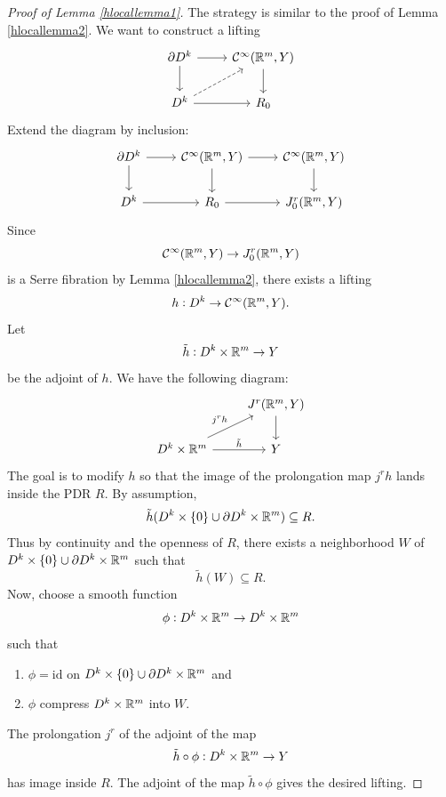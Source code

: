 \documentclass{article}
\newtheorem{proposed work}[theorem]{Proposed Work}
\theoremstyle{definition}
\begin{document}
\begin{proof}[Proof of Lemma \ref{hlocallemma1}]
The strategy is similar to the proof of Lemma \ref{hlocallemma2}. We
want to construct a lifting
\begin{equation*}
\begin{tikzcd}
\partial D^k \ar[d] \ar[r] &\cC^\infty(\R^m,Y) \ar[d] \\
D^k \ar[r] \ar[ur, dashed] & R_0
\end{tikzcd}
\end{equation*}
Extend the diagram by inclusion:
\begin{equation*}
\begin{tikzcd}
\partial D^k \ar[d] \ar[r] & \cC^\infty(\R^m,Y) \ar[d] \ar[r] & \cC^\infty(\R^m,Y) \ar[d] \\
D^k \ar[r] & R_0 \ar[r] & J^r_0(\R^m, Y)
\end{tikzcd}
\end{equation*}
Since
\begin{equation*}
\mathcal C^\infty(\mathbb R^m,Y) \to J^r_0(\mathbb R^m,Y)
\end{equation*}
is a Serre fibration by Lemma \ref{hlocallemma2}, there exists a lifting
\begin{equation*}
h: D^k \to \mathcal C^\infty(\mathbb R^m,Y).
\end{equation*}
Let
\begin{equation*}
\tilde{h}: D^k \times \mathbb R^m \to Y
\end{equation*}
be the adjoint of $h$. We have the following diagram:
\begin{equation*}
\begin{tikzcd}
{} & J^r(\R^m,Y) \ar[d] \\
D^k\times \R^m \ar[ur, "j^rh"] \ar[r, "\tilde{h}"] & Y
\end{tikzcd}
\end{equation*}
The goal is to modify $h$ so that the image of the prolongation map
$j^rh$ lands inside the PDR $R$. By assumption,
\begin{equation*}
\tilde{h}(D^k\times\{0\} \cup \partial D^k \times \mathbb R^m) \subseteq R.
\end{equation*}
Thus by continuity and the openness of $R$, there exists a
neighborhood $W$ of $D^k\times\{0\} \cup \partial D^k \times \mathbb R^m$ such that
\begin{equation*}
\tilde{h}(W) \subseteq R.
\end{equation*}
Now, choose a smooth function
\begin{equation*}
\phi: D^k \times \mathbb R^m \to D^k \times \mathbb R^m
\end{equation*}
such that
\begin{enumerate}
\item $\phi= \mathrm{id}$ on $D^k\times\{0\} \cup \partial D^k \times \mathbb R^m$ and
\item $\phi$ compress $D^k \times \mathbb R^m$ into $W$.
\end{enumerate}
The prolongation $j^r$ of the adjoint of the map
\begin{equation*}
\tilde{h} \circ \phi: D^k \times \mathbb R^m \to Y
\end{equation*}
has image inside $R$. The adjoint of the map $\tilde{h} \circ \phi$
gives the desired lifting.
\end{proof}
\end{document}

